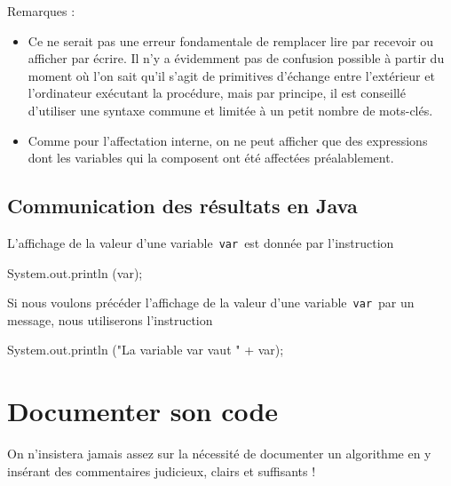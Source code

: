\documentclass[11pt,a4paper]{article}
\begin{document}
          Remarques :
          
					\begin{itemize}
				
			\item 
              Ce ne serait pas une erreur fondamentale de remplacer lire par recevoir ou afficher
              par \'ecrire. Il n'y a \'evidemment pas de confusion possible \`a partir du moment o\`u l'on
              sait qu'il s'agit de primitives d'\'echange entre l'ext\'erieur et l'ordinateur ex\'ecutant la
              proc\'edure, mais par principe, il est conseill\'e d'utiliser une syntaxe commune et limit\'ee
              \`a un petit nombre de mots-cl\'es.
            
			\item 
              Comme pour l'affectation interne, on ne peut afficher que des expressions dont les
              variables qui la composent ont \'et\'e affect\'ees pr\'ealablement.
            
					\end{itemize}
				
            \par
        \subsection{Communication des r\'esultats en Java}
          L'affichage de la valeur d'une variable \,\verb|var|\,  est donn\'ee par l'instruction
          
            \par
        \begin{Java}
 System.out.println (var);
				\end{Java}
          Si nous voulons pr\'ec\'eder l'affichage de la valeur d'une variable \,\verb|var|\,  par un message, 
          nous utiliserons l'instruction
        
            \par
        \begin{Java}
 System.out.println ("La variable var vaut " + var);
				\end{Java}\section{Documenter son code}
				On n'insistera jamais assez sur la n\'ecessit\'e de documenter un algorithme en y ins\'erant 
        des commentaires judicieux, clairs et suffisants !
      
            \par
\end{document}
